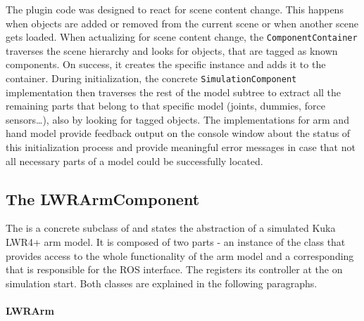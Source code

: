 The plugin code was designed to react for scene content change. This happens when objects are added or removed from the current scene or when another scene gets loaded. When actualizing for scene content change, the \texttt{ComponentContainer} traverses the scene hierarchy and looks for objects, that are tagged as known components. On success, it creates the specific instance and adds it to the container. During initialization, the concrete \texttt{SimulationComponent} implementation then traverses the rest of the model subtree to extract all the remaining parts that belong to that specific model (joints, dummies, force sensors\ldots), also by looking for tagged objects. The implementations for arm and hand model provide feedback output on the console window about the status of this initialization process and provide meaningful error messages in case that not all necessary parts of a model could be successfully located.



\subsection{The LWRArmComponent}

The  is a concrete subclass of  and states the abstraction of a simulated Kuka LWR4+ arm model. It is composed of two parts - an instance of the  class that provides access to the whole functionality of the arm model and a corresponding  that is responsible for the ROS interface. The  registers its controller at the  on simulation start. Both classes are explained in the following paragraphs.

\paragraph{LWRArm}

